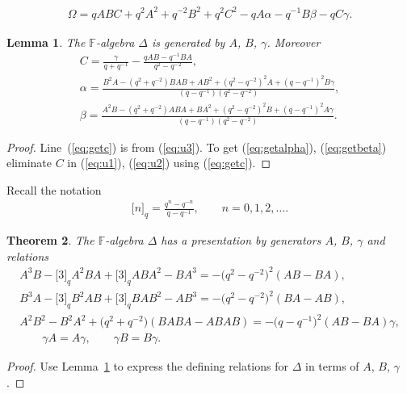 \documentclass[10pt,a4paper]{amsart}
\numberwithin{equation}{section}
\newtheorem{Theorem}{Theorem}[section]
\newtheorem{Lemma}[Theorem]{Lemma}
\begin{document}
\begin{gather}
\label{eq:caspreview}
\Omega =
qABC+q^2A^2+q^{-2}B^2+q^2C^2-qA\alpha-q^{-1}B\beta -q C\gamma.
\end{gather}

\begin{Lemma}
\label{lem:abgpres}
The $\mathbb F$-algebra $\Delta $ is generated by
$A$, $B$, $\gamma$. Moreover
\begin{gather}
C  =  \frac{\gamma}{q+q^{-1}}
-\frac{qAB-q^{-1}BA}{q^2-q^{-2}},
\label{eq:getc}
\\
\alpha  =  \frac{B^2A-(q^2+q^{-2})BAB+AB^2+
(q^2-q^{-2})^2A+(q-q^{-1})^2B\gamma}{(q-q^{-1})(q^2-q^{-2})},
\label{eq:getalpha}
\\
\beta  =  \frac{A^2B-(q^2+q^{-2})ABA+BA^2+
(q^2-q^{-2})^2B+(q-q^{-1})^2A\gamma}{(q-q^{-1})(q^2-q^{-2})}.
\label{eq:getbeta}
\end{gather}
\end{Lemma}

\begin{proof}\sloppy
Line~(\ref{eq:getc})
is from (\ref{eq:u3}).
To get
(\ref{eq:getalpha}),
(\ref{eq:getbeta})
eliminate $C$ in
(\ref{eq:u1}),
(\ref{eq:u2})
using
(\ref{eq:getc}).
\end{proof}

 Recall the notation
\begin{gather*}
\lbrack n \rbrack_q= \frac{q^n-q^{-n}}{q-q^{-1}}, \qquad
n=0,1,2,\ldots.
\end{gather*}




{\samepage

\begin{Theorem}
\label{prop:altpres}
The $\mathbb F$-algebra $\Delta $ has a  presentation by generators
$A$, $B$, $\gamma$ and
relations
 \begin{gather*}
 A^3B-\lbrack 3\rbrack_q A^2BA+\lbrack 3\rbrack_q ABA^2-BA^3
= -\big(q^2-q^{-2}\big)^2(AB-BA),
\\
 B^3A-\lbrack 3\rbrack_q B^2AB+\lbrack 3\rbrack_q BAB^2-AB^3
= -\big(q^2-q^{-2}\big)^2(BA-AB),
\\
 A^2B^2-B^2A^2+\big(q^2+q^{-2}\big)(BABA-ABAB) = -\big(q-q^{-1}\big)^2(AB-BA)\gamma,
\\
  \qquad \gamma A = A \gamma,   \qquad \gamma B=B \gamma.
 \end{gather*}
\end{Theorem}

\begin{proof}
Use Lemma~\ref{lem:abgpres} to
express the def\/ining relations
for $\Delta $ in terms of $A$, $B$, $\gamma$.
\end{proof}}
\end{document}
